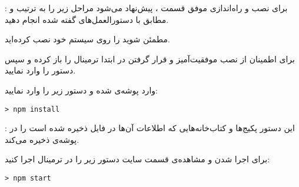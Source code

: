 
	 : برای نصب و راه‌اندازی موفق قسمت ، پیش‌نهاد می‌شود مراحل زیر را به ترتیب و مطابق با دستورالعمل‌های گفته شده انجام دهید.
	
		 مطمئن شوید  را روی سیستم خود نصب کرده‌اید.
		
		 برای اطمینان از نصب موفقیت‌آمیز و قرار گرفتن  در  ابتدا ترمینال را باز کرده و سپس دستور  را وارد نمایید.
		
		 وارد پوشه‌ی  شده و دستور زیر را وارد نمایید:
		\begin{latin}
			\begin{verbatim}
> npm install
			\end{verbatim}
		\end{latin}
	
	
	: این دستور پکیج‌ها و کتاب‌خانه‌هایی که اطلاعات آن‌ها در فایل  ذخیره شده است را در پوشه‌ی  ذخیره می‌کند.
	
		  برای اجرا شدن و مشاهده‌ی قسمت  سایت دستور زیر را در ترمینال اجرا کنید:
		\begin{latin}
			\begin{verbatim}
> npm start
			\end{verbatim}
		\end{latin}
	
